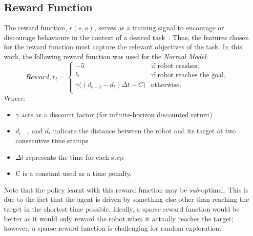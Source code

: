 \subsection{Reward Function}
The reward function, $r(s, a)$, serves as a training signal to encourage or discourage behaviours in the context of a desired task~\cite{zhu_safe_2019}. Thus, the features chosen for the reward function must capture the relevant objectives of the task. In this work, the following reward function was used for the \textit{Normal Model}:
\begin{equation}
Reward, r_{t} = 
\begin{cases}
  -5& \text{if robot crashes},\\
  5& \text{if robot reaches the goal},\\
  \gamma{\bigg((d_{t-1} - d_{t})\Delta{t} - C\bigg)}& \text{otherwise}.
  \\
\end{cases}
\end{equation}
Where:
\begin{itemize}
\item $\gamma$ acts as a discount factor (for infinite-horizon discounted return)
\item $d_{t-1}$ and $d_{t}$ indicate the distance between the robot and its target at two consecutive time stamps
\item $\Delta{t}$ represents the time for each step
\item C is a constant used as a time penalty.
\end{itemize}

Note that the policy learnt with this reward function may be \textit{sub}-optimal. This is due to the fact that the agent is driven by something else other than reaching the target in the shortest time possible. Ideally, a sparse reward function would be better as it would only reward the robot when it actually reaches the target; however, a sparse reward function is challenging for random exploration.

